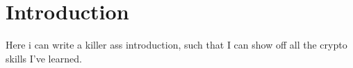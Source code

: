\documentclass[../master.tex]{subfiles}
\begin{document}
    \section{Introduction}\label{sec:introduction}
    Here i can write a killer ass introduction, such that I can show off all the crypto skills I've learned.
\end{document}
